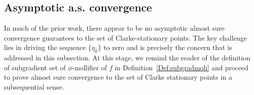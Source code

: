 \documentclass[11pt,reqno]{amsart}
\newcommand{\1}{{\bf 1}}
\newcommand{\2}{{\bf 2}}
\newcommand{\mr}[1]{{\color{blue}#1}}
\newcommand{\us}[1]{\textcolor{red}{#1}}
\newcommand{\bxi}{\boldsymbol{\xi}}
\newcommand{\al}{\alpha}
\numberwithin{equation}{section}
\newtheorem{proposition}{Proposition}[section]
\theoremstyle{remark}
\begin{document}
{				
				\subsection{{Asymptotic a.s. convergence}} \label{sec:5.3}

				{In much of the prior work, there appear to be no asymptotic almost sure convergence guarantees to the set of Clarke-stationary points. The key challenge lies in driving the sequence $\{\eta_k\}$ to zero and is precisely the concern that is addressed in this subsection.} At this stage, we remind the reader of the definition of subgradient set of $\phi$-mollifier of $f$ in Definition~\ref{Def:subgradmoli} {and proceed to prove almost sure convergence to the set of Clarke stationary points in a subsequential sense}. %
}
\end{document}
